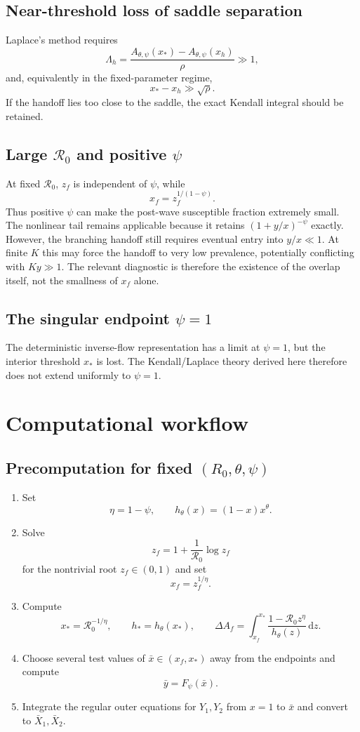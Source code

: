 \documentclass[11pt]{article}
\newcommand{\Rzero}{\mathcal R_0}
\newcommand{\hth}{h_\theta}
\newcommand{\Fpsi}{F_\psi}
\newcommand{\Apsi}{A_{\theta,\psi}}
\newcommand{\xf}{x_f}
\newcommand{\xs}{x_*}
\newcommand{\dd}{\,\mathrm{d}}
\begin{document}
\subsection{Near-threshold loss of saddle separation}
Laplace's method requires
\[
\Lambda_h
=\frac{\Apsi(\xs)-\Apsi(x_h)}\rho\gg1,
\]
and, equivalently in the fixed-parameter regime,
\[
\xs-x_h\gg\sqrt\rho.
\]
If the handoff lies too close to the saddle, the exact Kendall integral should be retained.

\subsection{Large \texorpdfstring{$\Rzero$}{R0} and positive \texorpdfstring{$\psi$}{psi}}
At fixed $\Rzero$, $z_f$ is independent of $\psi$, while
\[
\xf=z_f^{1/(1-\psi)}.
\]
Thus positive $\psi$ can make the post-wave susceptible fraction extremely small. The nonlinear tail remains applicable because it retains $(1+y/x)^{-\psi}$ exactly. However, the branching handoff still requires eventual entry into $y/x\ll1$. At finite $K$ this may force the handoff to very low prevalence, potentially conflicting with $Ky\gg1$. The relevant diagnostic is therefore the existence of the overlap itself, not the smallness of $\xf$ alone.

\subsection{The singular endpoint \texorpdfstring{$\psi=1$}{psi=1}}
The deterministic inverse-flow representation has a limit at $\psi=1$, but the interior threshold $\xs$ is lost. The Kendall/Laplace theory derived here therefore does not extend uniformly to $\psi=1$.

\section{Computational workflow}
\label{sec:workflow}

\subsection{Precomputation for fixed \texorpdfstring{$(R_0,\theta,\psi)$}{(R0,theta,psi)}}
\begin{enumerate}
\item Set
\[
\eta=1-\psi,
\qquad
\hth(x)=(1-x)x^\theta.
\]
\item Solve
\[
z_f=1+\frac1{\Rzero}\log z_f
\]
for the nontrivial root $z_f\in(0,1)$ and set
\[
\xf=z_f^{1/\eta}.
\]
\item Compute
\[
\xs=\Rzero^{-1/\eta},
\qquad
h_*=\hth(\xs),
\qquad
\Delta A_f=\int_{\xf}^{\xs}
\frac{1-\Rzero z^\eta}{\hth(z)}\dd z.
\]
\item Choose several test values of $\bar x\in(\xf,\xs)$ away from the endpoints and compute
\[
\bar y=\Fpsi(\bar x).
\]
\item Integrate the regular outer equations for $Y_1,Y_2$ from $x=1$ to $\bar x$ and convert to $\bar X_1,\bar X_2$.
\end{enumerate}
\end{document}
